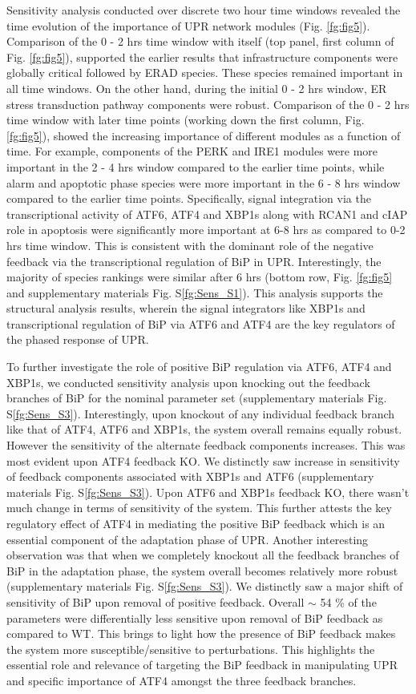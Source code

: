 \documentclass[12pt]{article}
\begin{document}
Sensitivity analysis conducted over discrete two hour time windows revealed the time evolution of the importance of UPR network modules (Fig. \ref{fg:fig5}). Comparison of the 0 - 2 hrs time window with itself (top panel, first column of Fig. \ref{fg:fig5}), supported the earlier results that infrastructure components were globally critical followed by ERAD species. These species remained important in all time windows. On the other hand, during the initial 0 - 2 hrs window, ER stress transduction pathway components were robust. Comparison of the 0 - 2 hrs time window with later time points (working down the first column, Fig. \ref{fg:fig5}), showed the increasing importance of different modules as a function of time. For example, components of the PERK and IRE1 modules were more important in the 2 - 4 hrs window compared to the earlier time points, while alarm and apoptotic phase species were more important in the 6 - 8 hrs window compared to the earlier time points. Specifically, signal integration via the transcriptional activity of ATF6, ATF4 and XBP1s along with RCAN1 and cIAP role in apoptosis were significantly more important at 6-8 hrs as compared to 0-2 hrs time window. This is consistent with the dominant role of the negative feedback via the transcriptional regulation of BiP in UPR. Interestingly, the majority of species rankings were similar after 6 hrs (bottom row,  Fig. \ref{fg:fig5} and supplementary materials Fig. S\ref{fg:Sens_S1}). This analysis supports the structural analysis results, wherein the signal integrators like XBP1s and transcriptional regulation of BiP via ATF6 and ATF4 are the key regulators of the phased response of UPR. 

To further investigate the role of positive BiP regulation via ATF6, ATF4 and XBP1s, we conducted sensitivity analysis upon knocking out the feedback branches of BiP for the nominal parameter set (supplementary materials Fig. S\ref{fg:Sens_S3}). Interestingly, upon knockout of any individual feedback branch like that of ATF4, ATF6 and XBP1s, the system overall remains equally robust. However the sensitivity of the alternate feedback components increases. This was most evident upon ATF4 feedback KO. We distinctly saw increase in sensitivity of feedback components associated with XBP1s and ATF6 (supplementary materials Fig. S\ref{fg:Sens_S3}). Upon ATF6 and XBP1s feedback KO, there wasn't much change in terms of sensitivity of the system. This further attests the key regulatory effect of ATF4 in mediating the positive BiP feedback which is an essential component of the adaptation phase of UPR. Another interesting observation was that when we completely knockout all the feedback branches of BiP in the adaptation phase, the system overall becomes relatively more robust (supplementary materials Fig. S\ref{fg:Sens_S3}). We distinctly saw a major shift of sensitivity of BiP upon removal of positive feedback. Overall $\sim$ 54 \% of the parameters were differentially less sensitive upon removal of BiP feedback as compared to WT. This brings to light how the presence of BiP feedback makes the system more susceptible/sensitive to perturbations. This highlights the essential role and relevance of targeting the BiP feedback in manipulating UPR and  specific importance of ATF4 amongst the three feedback branches.
 
\end{document}

